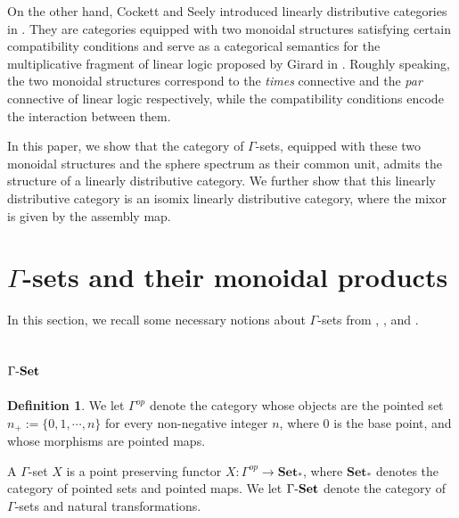 \documentclass{article}
\numberwithin{equation}{section}
\theoremstyle{definition}
\newtheorem{definition}[thm]{Definition}
\begin{document}
On the other hand, Cockett and Seely introduced linearly distributive categories in \cite{CS}.
They are categories equipped with two monoidal structures satisfying certain compatibility conditions and serve as a categorical semantics for the multiplicative fragment of linear logic proposed by Girard in \cite{Girard}.
Roughly speaking, the two monoidal structures correspond to the {\it times} connective and the {\it par} connective of linear logic respectively, while the compatibility conditions encode the interaction between them.



In this paper, we show that the category of $\Gamma$-sets, equipped with these two monoidal structures and the sphere spectrum as their common unit, admits the structure of a linearly distributive category.
We further show that this linearly distributive category is an isomix linearly distributive category, where the mixor is given by the assembly map.





















\section{$\Gamma$-sets and their monoidal products}
In this section, we recall some necessary notions about $\Gamma$-sets from \cite{CC}, \cite{DGM}, and \cite{Lydakis}.
\subsection{$\Gamma \mathchar`-\mathbf{Set}$}

\begin{definition}We let $\Gamma^{op}$ denote the category whose objects are the pointed set $n_+:=\{0, 1, \cdots, n\}$ for every non-negative integer $n$, where $0$ is the base point, and whose morphisms are pointed maps.

A $\Gamma$-set $X$ is a point preserving functor $X:\Gamma^{op}\to\mathbf{Set}_*$, where $\mathbf{Set}_*$ denotes the category of pointed sets and pointed maps.
We let $\Gamma \mathchar`-\mathbf{Set}$ denote the category of $\Gamma$-sets and natural transformations.
\end{definition}
\end{document}

